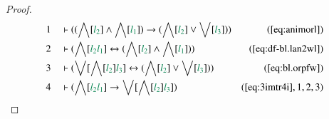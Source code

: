 \begin{proof}
\begin{align}
  1 &&  & \vdash ( ( \bigwedge[ \mwl{l_2} ] \wedge \bigwedge[ \mwl{l_1} ] )
      \rightarrow ( \bigwedge[ \mwl{l_2} ] \vee \bigvee[
      \mwl{l_3} ] ) )&(\mbox{\ref{eq:animorl}})\notag
  \\ 2 &&  & \vdash ( \bigwedge[ \mwl{l_2} \mwl{l_1} ] \leftrightarrow (
      \bigwedge[ \mwl{l_2} ] \wedge \bigwedge[ \mwl{l_1} ]
      ) )&(\mbox{\ref{eq:df-bl.lan2wl}})\notag
  \\ 3 &&  & \vdash ( \bigvee[ \bigwedge[ \mwl{l_2} ] \mwl{l_3} ]
      \leftrightarrow ( \bigwedge[ \mwl{l_2} ] \vee
      \bigvee[ \mwl{l_3} ] )
      )&(\mbox{\ref{eq:bl.orpfw}})\notag
  \\ 4 &&  & \vdash ( \bigwedge[ \mwl{l_2} \mwl{l_1} ] \rightarrow \bigvee[
      \bigwedge[ \mwl{l_2} ] \mwl{l_3} ]
      )&(\mbox{\ref{eq:3imtr4i}},1,2,3)\notag
\end{align}
\end{proof}

